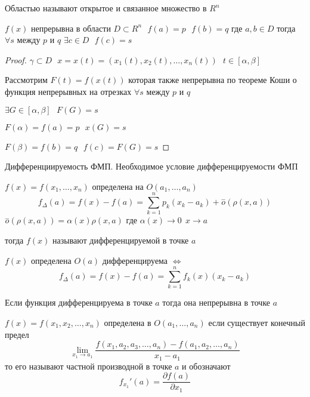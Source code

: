 \begin{define}[области]
  Областью называют открытое и связанное множество в $R^n$
\end{define}

\begin{theorem}
  $f(x)$ непрерывна в области $D \subset R^n ~~~ f(a) = p ~~~ f(b) = q$
  где $a,b \in D$ тогда $\forall s$ между $p$ и $q$
  $\exists c \in D ~~~ f(c) = s$
\end{theorem}

\begin{proof}
  $\gamma \subset D ~~~ x = x(t) = (x_1(t), x_2(t), \ldots, x_n(t)) ~~~
  t \in [\alpha, \beta]$

  Рассмотрим $F(t) = f(x(t))$ которая также непрерывна по теореме Коши о
  функция непрерывных на отрезках $\forall s$ между $p$ и $q$

  $\exists G \in [\alpha, \beta] ~~~ F(G) = s$

  $F(\alpha) = f(a) = p ~~~ x(G) = s$

  $F(\beta) = f(b) = q ~~~ f(c) = F(G) = s$
\end{proof}

\begin{title}[\Large]
  Дифференциируемость ФМП. Необходимое условие дифференцируемости ФМП
\end{title}

\begin{define}
  $f(x) = f(x_1, \ldots, x_n)$ определена на $O(a_1, \ldots, a_n)$
  $$
  f_{\Delta}(a) = f(x) - f(a) = \sum_{k=1}^n p_k (x_k - a_k) +
  \stackrel{-}{o}(\rho(x, a))
  $$
  $\stackrel{-}{o}(\rho(x, a)) = \alpha(x) \rho(x, a)$ где $\alpha(x) \to 0 ~~
  x \to a$

  тогда $f(x)$ называют дифференцируемой в точке $a$
\end{define}

\begin{block}[Критерий]
  $f(x)$ определена $O(a)$ дифференцируема $\Leftrightarrow$
  $$
  f_{\Delta}(a) = f(x) - f(a) = \sum_{k=1}^n f_k(x)(x_k - a_k)
  $$
\end{block}

\begin{theorem}
  Если функция дифференцируема в точке $a$ тогда она непрерывна в точке $a$
\end{theorem}

\begin{define}
  $f(x) = f(x_1, x_2, \ldots, x_n)$ определена в $O(a_1, \ldots, a_n)$ если
  существует конечный предел
  $$
  \lim_{x_1 \to a_1}
  \frac{f(x_1, a_2, a_3, \ldots, a_n) - f(a_1, a_2, \ldots, a_n)}{x_1 - a_1}
  $$
  то его называют частной производной в точке $a$ и обозначают
  $$
  f_{x_1}'(a) = \frac{\partial f(a)}{\partial x_1}
  $$
\end{define}

